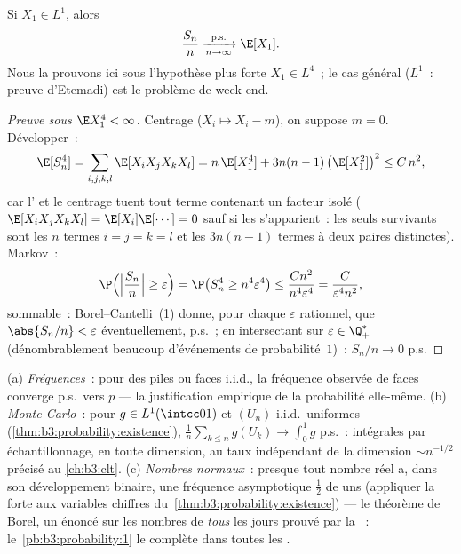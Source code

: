 \begin{theorem}
\label{thm:b3:probability:slln}
Si $X_1 \in L^1$, alors
\[
\frac{S_n}{n} \xrightarrow[n\to\infty]{\text{p.s.}} \E[X_1].
\]
Nous la prouvons ici sous l'hypothèse plus forte $X_1 \in
L^4$~; le cas général ($L^1$~: preuve d'Etemadi) est le
problème de week-end.
\end{theorem}

\begin{proof}[Preuve sous $\E X_1^4 < \infty$]
Centrage ($X_i \mapsto X_i - m$), on suppose $m = 0$.
Développer~:
\[
\E[S_n^4] = \sum_{i,j,k,l}\E[X_iX_jX_kX_l]
= n\,\E[X_1^4] + 3n(n-1)\,\bigl(\E[X_1^2]\bigr)^2 \leq
C\,n^2 ,
\]
car l' et le centrage tuent tout terme contenant
un facteur isolé ($\E[X_iX_jX_kX_l] = \E[X_i]\E[\cdots] =
0$ sauf si les  s'apparient~: les seuls survivants
sont les $n$ termes $i=j=k=l$ et les $3n(n-1)$ termes à
deux paires distinctes). Markov~:
\[
\P\Bigl(\Bigl|\frac{S_n}n\Bigr| \geq \varepsilon\Bigr)
= \P\bigl(S_n^4 \geq n^4\varepsilon^4\bigr)
\leq \frac{Cn^2}{n^4\varepsilon^4} =
\frac{C}{\varepsilon^4n^2},
\]
sommable~: Borel--Cantelli~(1) donne, pour chaque
$\varepsilon$ rationnel, que $\abs{S_n/n} < \varepsilon$
éventuellement, p.s.~; en intersectant sur $\varepsilon \in
\Q_+^*$ (dénombrablement beaucoup d'événements de
probabilité~$1$)~: $S_n/n \to 0$ p.s.
\end{proof}

\begin{example}
\label{ex:b3:probability:sllnapps}
(a) \emph{Fréquences}~: pour des piles ou faces i.i.d., la
fréquence observée de faces converge p.s.\ vers $p$ --- la
justification empirique de la probabilité elle-même.
(b) \emph{Monte-Carlo}~: pour
$g \in L^1(\intcc01)$ et $(U_n)$ i.i.d.\ uniformes
(\cref{thm:b3:probability:existence}),
$\frac1n\sum_{k\leq n}g(U_k) \to \int_0^1g$ p.s.~:
intégrales par échantillonnage, en toute dimension, au taux
indépendant de la dimension $\sim n^{-1/2}$ précisé au
\cref{ch:b3:clt}.
(c) \emph{Nombres normaux}~: presque tout nombre réel a,
dans son développement binaire, une fréquence asymptotique
$\frac12$ de uns (appliquer la  forte aux variables
chiffres du~\cref{thm:b3:probability:existence}) --- le
théorème de Borel, un énoncé sur les nombres de \emph{tous}
les jours prouvé par la ~: le~\cref{pb:b3:probability:1}
le complète dans toutes les .
\end{example}

